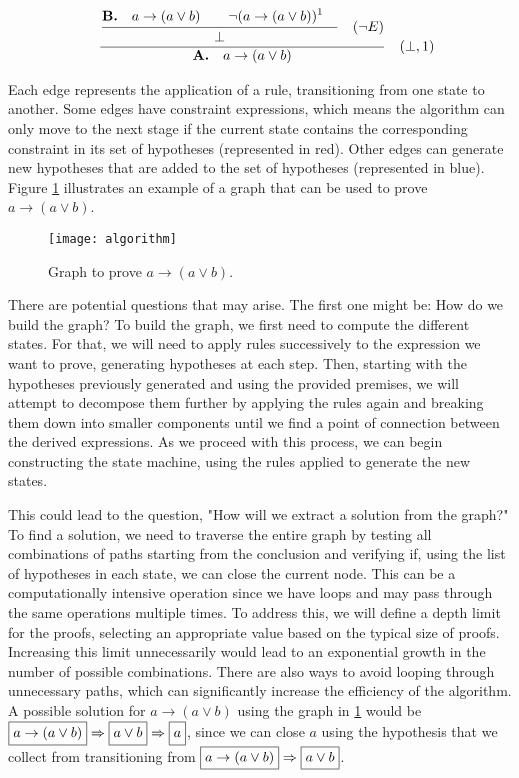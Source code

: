\[
\begin{array}{c c}
   \quad \frac{\displaystyle \frac{\displaystyle 
    {\displaystyle \textbf{B.} \quad a \to (a \lor b) \strut} \quad \quad \neg(a \to (a \lor b))^1 \quad \strut} {\displaystyle \bot \strut} \quad (\neg E) \strut}
    {\displaystyle \textbf{A.} \quad a \to (a \lor b)\strut} \quad (\bot, 1) 
\end{array}
\]

Each edge represents the application of a rule, transitioning from one state to another. Some edges have constraint expressions, which means the algorithm can only move to the next stage if the current state contains the corresponding constraint in its set of hypotheses (represented in red). Other edges can generate new hypotheses that are added to the set of hypotheses (represented in blue). Figure \ref{img:algorithm} illustrates an example of a graph that can be used to prove \(a \to (a \lor b)\).

\begin{figure}[htbp]
    \centering
    \texttt{[image: algorithm]}
    \caption{Graph to prove \(a \to (a \lor b)\).}
    \label{img:algorithm}
\end{figure}

There are potential questions that may arise. The first one might be: How do we build the graph? To build the graph, we first need to compute the different states. For that, we will need to apply rules successively to the expression we want to prove, generating hypotheses at each step. Then, starting with the hypotheses previously generated and using the provided premises, we will attempt to decompose them further by applying the rules again and breaking them down into smaller components until we find a point of connection between the derived expressions. As we proceed with this process, we can begin constructing the state machine, using the rules applied to generate the new states.

This could lead to the question, "How will we extract a solution from the graph?" To find a solution, we need to traverse the entire graph by testing all combinations of paths starting from the conclusion and verifying if, using the list of hypotheses in each state, we can close the current node. This can be a computationally intensive operation since we have loops and may pass through the same operations multiple times. To address this, we will define a depth limit for the proofs, selecting an appropriate value based on the typical size of proofs. Increasing this limit unnecessarily would lead to an exponential growth in the number of possible combinations. There are also ways to avoid looping through unnecessary paths, which can significantly increase the efficiency of the algorithm. A possible solution for \(a \to (a \lor b)\) using the graph in \ref{img:algorithm} would be \(\boxed{a \to (a \lor b)} \Rightarrow \boxed{\vphantom{a \to (a \lor b)}a \lor b} \Rightarrow \boxed{\vphantom{a \to (a \lor b)}a}\), since we can close \(a\) using the hypothesis that we collect from transitioning from \(\boxed{a \to (a \lor b)} \Rightarrow \boxed{\vphantom{a \to (a \lor b)}a \lor b}\).


